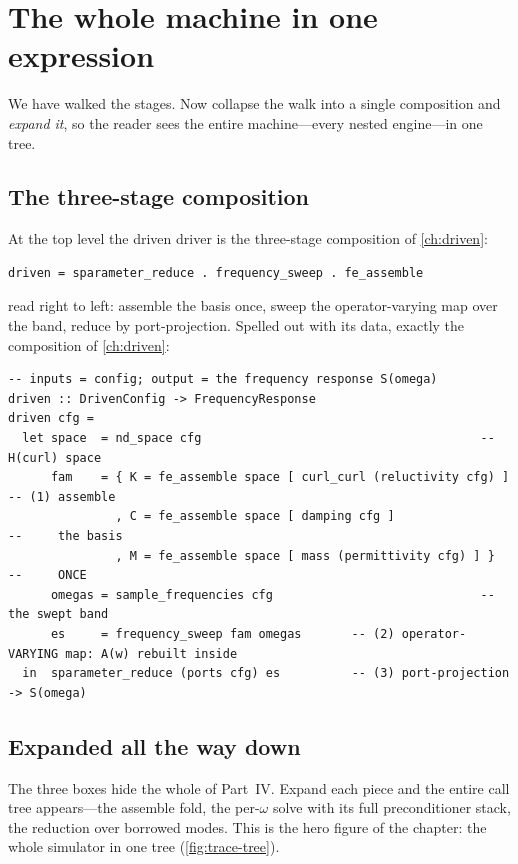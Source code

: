 \section{The whole machine in one expression}
\label{sec:trace-composition}

We have walked the stages. Now collapse the walk into a single composition and
\emph{expand it}, so the reader sees the entire machine---every nested engine---in
one tree.

\subsection{The three-stage composition}

At the top level the driven driver is the three-stage composition of
\cref{ch:driven}:
\begin{lstlisting}[style=l4style]
driven = sparameter_reduce . frequency_sweep . fe_assemble
\end{lstlisting}
read right to left: assemble the basis once, sweep the operator-varying map over
the band, reduce by port-projection. Spelled out with its data, exactly the
composition of \cref{ch:driven}:
\begin{lstlisting}[style=l4style]
-- inputs = config; output = the frequency response S(omega)
driven :: DrivenConfig -> FrequencyResponse
driven cfg =
  let space  = nd_space cfg                                       -- H(curl) space
      fam    = { K = fe_assemble space [ curl_curl (reluctivity cfg) ]  -- (1) assemble
               , C = fe_assemble space [ damping cfg ]                  --     the basis
               , M = fe_assemble space [ mass (permittivity cfg) ] }    --     ONCE
      omegas = sample_frequencies cfg                             -- the swept band
      es     = frequency_sweep fam omegas       -- (2) operator-VARYING map: A(w) rebuilt inside
  in  sparameter_reduce (ports cfg) es          -- (3) port-projection -> S(omega)
\end{lstlisting}

\subsection{Expanded all the way down}

The three boxes hide the whole of Part~IV. Expand each piece and the entire call
tree appears---the assemble fold, the per-$\omega$ solve with its full
preconditioner stack, the reduction over borrowed modes. This is the hero figure
of the chapter: the whole simulator in one tree (\cref{fig:trace-tree}).

